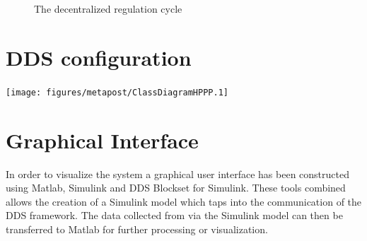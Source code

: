 \begin{figure}[b]
	
	\caption{The decentralized regulation cycle}
	\label{fig:timingDecentral}
\end{figure}


%	
%	

\section{DDS configuration}


\texttt{[image: figures/metapost/ClassDiagramHPPP.1]}

\section{Graphical Interface} \label{sec:graphicalInterface}
In order to visualize the system a graphical user interface has been constructed using Matlab, Simulink and DDS Blockset for Simulink.
These tools combined allows the creation of a Simulink model which taps into the communication of the DDS framework.
The data collected from via the Simulink model can then be transferred to Matlab for further processing or visualization.

